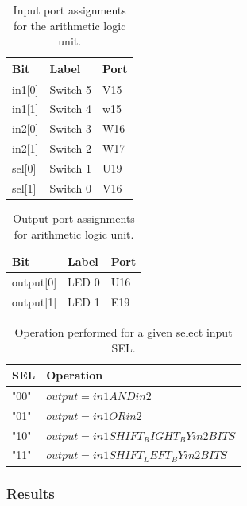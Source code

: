 \documentclass[11pt]{article}
\begin{document}
\begin{table}[H]
\begin{center}
\begin{tabular}{| l | l | l |}
	\hline
	Bit & Label & Port \\ \hline
	in1[0] &  Switch 5 & V15 \\ \hline
	in1[1] & Switch 4 & w15 \\ \hline
	in2[0] & Switch 3 & W16 \\ \hline
	in2[1] & Switch 2 & W17 \\ \hline
	sel[0] & Switch 1 & U19 \\ \hline
	sel[1] & Switch 0 & V16 \\ \hline
\end{tabular}
\caption{\label{tab:alu_input_Ports}Input port assignments for  the arithmetic logic unit.}
\end{center}
\end{table}

\begin{table}[H]
\begin{center}
\begin{tabular}{| l | l | l |}
	\hline
	Bit & Label & Port \\ \hline
	output[0] & LED 0 & U16 \\ \hline
	output[1] & LED 1 & E19 \\ \hline
\end{tabular}
\caption{\label{tab:alu_output_Ports}Output port assignments for arithmetic logic unit.}
\end{center}
\end{table}

\begin{table}[H]
\begin{center}
\begin{tabular}{| l | l |}
	\hline
	SEL & Operation \\ \hline
	"00" & $output = in1 AND in2$ \\ \hline
	"01" & $output = in1 OR in2$ \\ \hline
	"10" & $output = in1 SHIFT_RIGHT_BY in2 BITS$ \\ \hline
	"11" & $output = in1 SHIFT_LEFT_BY in2 BITS$ \\ \hline
\end{tabular}
\caption{\label{tab:alu_sel_ops}Operation performed for a given select input SEL.}
\end{center}
\end{table}

\subsubsection{Results}
\end{document}
